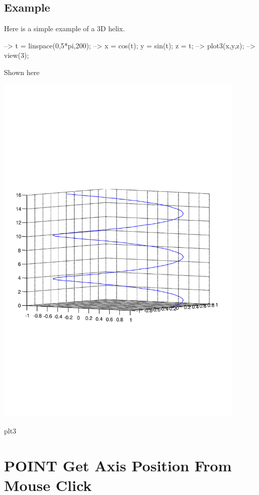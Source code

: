  \hypertarget{variables_struct_Example}{}\subsection{Example}\label{variables_struct_Example}
Here is a simple example of a 3\-D helix.


\begin{DoxyVerbInclude}
--> t = linspace(0,5*pi,200);
--> x = cos(t); y = sin(t); z = t;
--> plot3(x,y,z);
--> view(3);
\end{DoxyVerbInclude}


Shown here  
\begin{DoxyImage}
\includegraphics[width=12cm]{plt3}
\caption{plt3}
\end{DoxyImage}
 \hypertarget{handle_point}{}\section{P\-O\-I\-N\-T Get Axis Position From Mouse Click}\label{handle_point}

